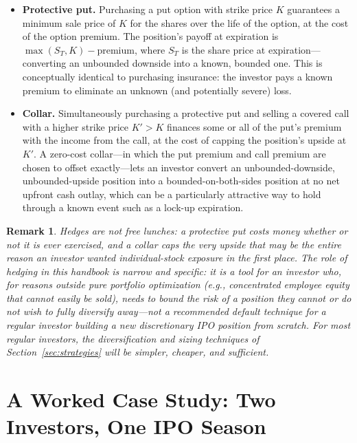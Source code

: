 \documentclass[conference]{IEEEtran}
\newtheorem{remark}{Remark}
\begin{document}
\begin{itemize}
    \item \textbf{Protective put.} Purchasing a put option with strike price $K$ guarantees a minimum sale price of $K$ for the shares over the life of the option, at the cost of the option premium. The position's payoff at expiration is $\max(S_T, K) - \text{premium}$, where $S_T$ is the share price at expiration---converting an unbounded downside into a known, bounded one. This is conceptually identical to purchasing insurance: the investor pays a known premium to eliminate an unknown (and potentially severe) loss.
    \item \textbf{Collar.} Simultaneously purchasing a protective put and selling a covered call with a higher strike price $K' > K$ finances some or all of the put's premium with the income from the call, at the cost of capping the position's upside at $K'$. A zero-cost collar---in which the put premium and call premium are chosen to offset exactly---lets an investor convert an unbounded-downside, unbounded-upside position into a bounded-on-both-sides position at no net upfront cash outlay, which can be a particularly attractive way to hold through a known event such as a lock-up expiration.
\end{itemize}

\begin{remark}
Hedges are not free lunches: a protective put costs money whether or not it is ever exercised, and a collar caps the very upside that may be the entire reason an investor wanted individual-stock exposure in the first place. The role of hedging in this handbook is narrow and specific: it is a tool for an investor who, for reasons outside pure portfolio optimization (e.g., concentrated employee equity that cannot easily be sold), needs to \emph{bound} the risk of a position they cannot or do not wish to fully diversify away---not a recommended default technique for a regular investor building a new discretionary IPO position from scratch. For most regular investors, the diversification and sizing techniques of Section~\ref{sec:strategies} will be simpler, cheaper, and sufficient.
\end{remark}

\section{A Worked Case Study: Two Investors, One IPO Season}
\label{sec:case}
\end{document}

